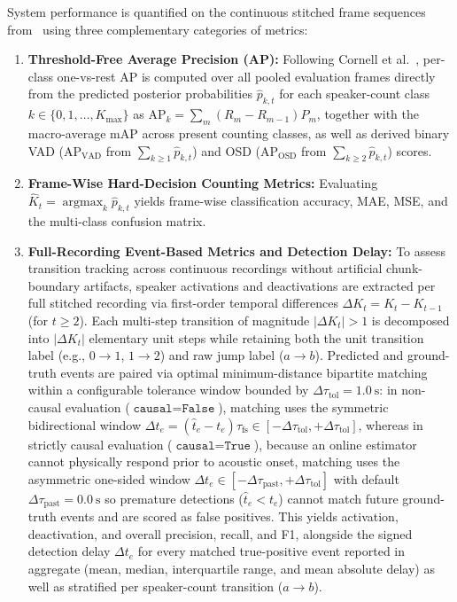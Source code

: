 \documentclass[lettersize,journal]{IEEEtran}
\DeclareMathOperator*{\argmax}{argmax}
\begin{document}
System performance is quantified on the continuous stitched frame sequences from~ using three complementary categories of metrics:
\begin{enumerate}
  \item \textbf{Threshold-Free Average Precision (\gls{AP}):} Following Cornell et al.~\cite{cornell2022overlapped}, per-class one-vs-rest \gls{AP} is computed over all pooled evaluation frames directly from the predicted posterior probabilities $\widehat{p}_{k,t}$ for each speaker-count class $k \in \{0, 1, \dots, K_{\mathrm{max}}\}$ as $\mathrm{AP}_k = \sum_m (R_m - R_{m-1}) P_m$, together with the macro-average $\mathrm{mAP}$ across present counting classes, as well as derived binary \gls{VAD} ($\mathrm{AP}_{\mathrm{VAD}}$ from $\sum_{k \ge 1} \widehat{p}_{k,t}$) and \gls{OSD} ($\mathrm{AP}_{\mathrm{OSD}}$ from $\sum_{k \ge 2} \widehat{p}_{k,t}$) scores.
  \item \textbf{Frame-Wise Hard-Decision Counting Metrics:} Evaluating $\widehat{K}_t = \argmax_k \widehat{p}_{k,t}$ yields frame-wise classification accuracy, \gls{MAE}, \gls{MSE}, and the multi-class confusion matrix.
  \item \textbf{Full-Recording Event-Based Metrics and Detection Delay:} To assess transition tracking across continuous recordings without artificial chunk-boundary artifacts, speaker activations and deactivations are extracted per full stitched recording via first-order temporal differences $\Delta K_t = K_t - K_{t-1}$ (for $t \ge 2$). Each multi-step transition of magnitude $|\Delta K_t| > 1$ is decomposed into $|\Delta K_t|$ elementary unit steps while retaining both the unit transition label (e.g., $0 \to 1$, $1 \to 2$) and raw jump label ($a \to b$). Predicted and ground-truth events are paired via optimal minimum-distance bipartite matching within a configurable tolerance window bounded by $\Delta\tau_{\mathrm{tol}} = \SI{1.0}{\second}$: in non-causal evaluation ($\texttt{causal} = \texttt{False}$), matching uses the symmetric bidirectional window $\Delta t_e = (\hat{t}_e - t_e)\tau_{\mathrm{fs}} \in [-\Delta\tau_{\mathrm{tol}}, +\Delta\tau_{\mathrm{tol}}]$, whereas in strictly causal evaluation ($\texttt{causal} = \texttt{True}$), because an online estimator cannot physically respond prior to acoustic onset, matching uses the asymmetric one-sided window $\Delta t_e \in [-\Delta\tau_{\mathrm{past}}, +\Delta\tau_{\mathrm{tol}}]$ with default $\Delta\tau_{\mathrm{past}} = \SI{0.0}{\second}$ so premature detections ($\hat{t}_e < t_e$) cannot match future ground-truth events and are scored as false positives. This yields activation, deactivation, and overall precision, recall, and \gls{F1}, alongside the signed detection delay $\Delta t_e$ for every matched true-positive event reported in aggregate (mean, median, interquartile range, and mean absolute delay) as well as stratified per speaker-count transition ($a \to b$).
\end{enumerate}
\end{document}
